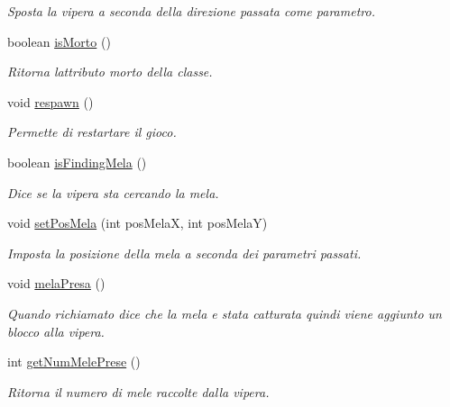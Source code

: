 \begin{DoxyCompactItemize}
\begin{DoxyCompactList}\small\item\em Sposta la vipera a seconda della direzione passata come parametro. \end{DoxyCompactList}\item 
boolean \mbox{\hyperlink{class_snake_1_1game_1_1utility_1_1game_manager_aa90b60b508f662fce93e3e8250b2c304}{is\+Morto}} ()
\begin{DoxyCompactList}\small\item\em Ritorna l\textquotesingle{}attributo morto della classe. \end{DoxyCompactList}\item 
void \mbox{\hyperlink{class_snake_1_1game_1_1utility_1_1game_manager_ac578ca44493fe34e6cb1b2093cf79341}{respawn}} ()
\begin{DoxyCompactList}\small\item\em Permette di restartare il gioco. \end{DoxyCompactList}\item 
boolean \mbox{\hyperlink{class_snake_1_1game_1_1utility_1_1game_manager_ad36cea66da3e5e8f3a9fdd8decd6f70b}{is\+Finding\+Mela}} ()
\begin{DoxyCompactList}\small\item\em Dice se la vipera sta cercando la mela. \end{DoxyCompactList}\item 
void \mbox{\hyperlink{class_snake_1_1game_1_1utility_1_1game_manager_a38aa4a80eb7f9db1e033f67dc1c220b0}{set\+Pos\+Mela}} (int pos\+MelaX, int pos\+MelaY)
\begin{DoxyCompactList}\small\item\em Imposta la posizione della mela a seconda dei parametri passati. \end{DoxyCompactList}\item 
void \mbox{\hyperlink{class_snake_1_1game_1_1utility_1_1game_manager_a3f6240b54a13e397255c9b3f7354cf45}{mela\+Presa}} ()
\begin{DoxyCompactList}\small\item\em Quando richiamato dice che la mela e\textquotesingle{} stata catturata quindi viene aggiunto un blocco alla vipera. \end{DoxyCompactList}\item 
int \mbox{\hyperlink{class_snake_1_1game_1_1utility_1_1game_manager_a5af927824d6cd9c9c30b0607cbdab546}{get\+Num\+Mele\+Prese}} ()
\begin{DoxyCompactList}\small\item\em Ritorna il numero di mele raccolte dalla vipera. \end{DoxyCompactList}\item 

\end{DoxyCompactItemize}
